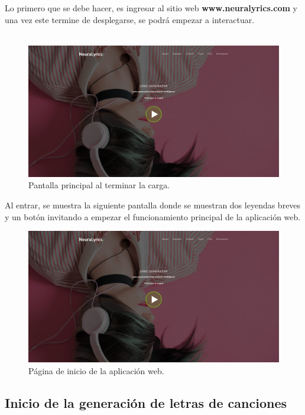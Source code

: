 \documentclass[12pt, a4paper, titlepage]{report}
\begin{document}
Lo primero que se debe hacer, es ingresar al sitio web \textbf{www.neuralyrics.com} y una vez este termine de desplegarse, se podrá empezar a interactuar.\\\\
\begin{figure}[H]
	\includegraphics[width=13cm]{./imagenes/Pruebas/pprincipal.png}
	\centering \caption{Pantalla principal al terminar la carga.}
\end{figure}
Al entrar, se muestra la siguiente pantalla donde se muestran dos leyendas breves y un botón invitando a empezar el funcionamiento principal de la aplicación web.
\begin{figure}[H]
	\includegraphics[width=13cm]{./imagenes/Pruebas/pprincipal.png}
	\centering \caption{Página de inicio de la aplicación web.}
\end{figure}

\subsection{Inicio de la generación de letras de canciones}
\end{document}
